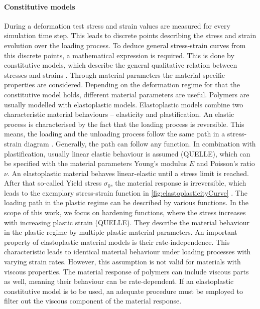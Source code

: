 \paragraph{Constitutive models}
During a deformation test stress and strain values are measured for every simulation time step. This leads to discrete points describing the stress and strain evolution over the loading process. To deduce general stress-strain curves from this discrete points, a mathematical expression is required. This is done by constitutive models, which describe the general qualitative relation between stresses and strains \cite{mergheim_lecture_nodate}. Through material parameters the material specific properties are considered.
Depending on the deformation regime for that the constitutive model holds, different material parameters are useful. Polymers are usually modelled with elastoplastic models. Elastoplastic models combine two characteristic material behaviours – elasticity and plastification. An elastic process is characterised by the fact that the loading process is reversible. This means, the loading and the unloading process follow the same path in a stress-strain diagram \cite{mergheim_lecture_nodate}. Generally, the path can follow any function. In combination with plastification, usually linear elastic behaviour is assumed (QUELLE), which can be specified with the material parameters Young's modulus $E$ and Poisson's ratio $\nu$. An elastoplastic material behaves linear-elastic until a stress limit is reached. After that so-called Yield stress $\sigma_0$, the material response is irreversible, which leads to the exemplary stress-strain function in \autoref{fig:elastoplasticityCurve} \cite{mergheim_lecture_nodate}. The loading path in the plastic regime can be described by various functions. In the scope of this work, we focus on hardening functions, where the stress increases with increasing plastic strain (QUELLE). They describe the material behaviour in the plastic regime by multiple plastic material parameters. An important property of elastoplastic material models is their rate-independence. This characteristic leads to identical material behaviour under loading processes with varying strain rates. However, this assumption is not valid for materials with viscous properties. The material response of polymers can include viscous parts as well, meaning their behaviour can be rate-dependent. If an elastoplastic constitutive model is to be used, an adequate procedure must be employed to filter out the viscous component of the material response. 


